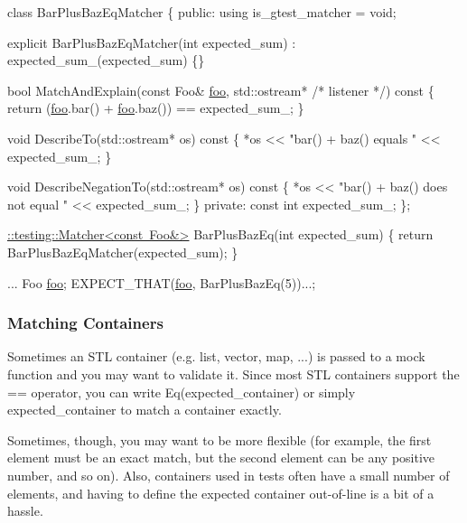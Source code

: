 \begin{DoxyCode}
\textcolor{keyword}{class }BarPlusBazEqMatcher \{
 \textcolor{keyword}{public}:
  \textcolor{keyword}{using} is\_gtest\_matcher = void;

  \textcolor{keyword}{explicit} BarPlusBazEqMatcher(\textcolor{keywordtype}{int} expected\_sum)
      : expected\_sum\_(expected\_sum) \{\}

  \textcolor{keywordtype}{bool} MatchAndExplain(\textcolor{keyword}{const} Foo& \mbox{\hyperlink{namespacefoo}{foo}},
                       std::ostream* \textcolor{comment}{/* listener */})\textcolor{keyword}{ const }\{
    \textcolor{keywordflow}{return} (\mbox{\hyperlink{namespacefoo}{foo}}.bar() + \mbox{\hyperlink{namespacefoo}{foo}}.baz()) == expected\_sum\_;
  \}

  \textcolor{keywordtype}{void} DescribeTo(std::ostream* os)\textcolor{keyword}{ const }\{
    *os << \textcolor{stringliteral}{"bar() + baz() equals "} << expected\_sum\_;
  \}

  \textcolor{keywordtype}{void} DescribeNegationTo(std::ostream* os)\textcolor{keyword}{ const }\{
    *os << \textcolor{stringliteral}{"bar() + baz() does not equal "} << expected\_sum\_;
  \}
 \textcolor{keyword}{private}:
  \textcolor{keyword}{const} \textcolor{keywordtype}{int} expected\_sum\_;
\};

\mbox{\hyperlink{classtesting_1_1Matcher}{::testing::Matcher<const Foo&>}} BarPlusBazEq(\textcolor{keywordtype}{int} expected\_sum) \{
  \textcolor{keywordflow}{return} BarPlusBazEqMatcher(expected\_sum);
\}

...
  Foo \mbox{\hyperlink{namespacefoo}{foo}};
  EXPECT\_THAT(\mbox{\hyperlink{namespacefoo}{foo}}, BarPlusBazEq(5))...;
\end{DoxyCode}


\subsubsection*{Matching Containers}

Sometimes an S\+TL container (e.\+g. list, vector, map, ...) is passed to a mock function and you may want to validate it. Since most S\+TL containers support the {\ttfamily ==} operator, you can write {\ttfamily Eq(expected\+\_\+container)} or simply {\ttfamily expected\+\_\+container} to match a container exactly.

Sometimes, though, you may want to be more flexible (for example, the first element must be an exact match, but the second element can be any positive number, and so on). Also, containers used in tests often have a small number of elements, and having to define the expected container out-\/of-\/line is a bit of a hassle.

